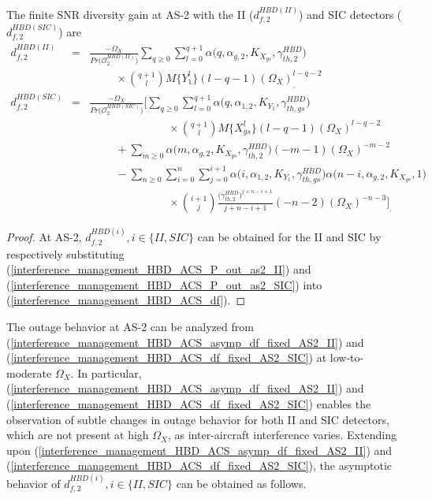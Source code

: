 \begin{proposition}
The finite SNR diversity gain at AS-2 with the II ($d_{f,2}^{HBD(II)}$) and SIC detectors ($d_{f,2}^{HBD(SIC)}$) are
\begin{eqnarray} 
d_{f,2}^{HBD(II)} & = &  \frac{-\Omega_X}{Pr\big(\mathcal{O}_{2}^{HBD(II)}\big)} \sum_{q\geq0} \sum_{l=0}^{q+1} \alpha\big(q,\alpha_{g,2}, K_{X_{gs}}, \gamma_{th,2}^{HBD}\big) \nonumber \\
 & & \hspace{1cm} \times \binom{q+1}{l} M\{Y_1^l\} (l-q-1) (\Omega_X)^{l-q-2}_, \label{interference_management_HBD_ACS_asymp_df_fixed_AS2_II} \\
d_{f,2}^{HBD(SIC)} & = & \frac{-\Omega_X}{Pr\big(\mathcal{O}_{2}^{HBD(SIC)}\big)} \Bigg[  \sum_{q\geq0}\sum_{l=0}^{q+1} \alpha\big(q,\alpha_{1,2},K_{Y_{1}},\gamma_{th,gs}^{HBD}\big) \nonumber \\
 & & \hspace{3cm} \times \binom{q+1}{l} M\{X_{gs}^l\} (l-q-1) (\Omega_{X})^{l-q-2} \nonumber\\
 & & \hspace{1cm} + \sum_{m\geq0} \alpha\big(m,\alpha_{g,2},K_{X_{gs}},\gamma_{th,2}^{HBD}\big) (-m-1) (\Omega_{X})^{-m-2} \nonumber \\
 & & \hspace{1cm} - \sum_{n\geq0}\sum_{i=0}^{n}\sum_{j=0}^{i+1} \alpha\big(i,\alpha_{1,2},K_{Y_{1}},\gamma_{th,gs}^{HBD}\big) \alpha\big(n-i,\alpha_{g,2},K_{X_{gs}},1\big) \nonumber\\
 & & \hspace{3cm} \times \binom{i+1}{j} \frac{\big(\gamma_{th,2}^{HBD}\big)^{j+n-i+1}}{j+n-i+1} (-n-2) (\Omega_X)^{-n-3} \Bigg]_. \label{interference_management_HBD_ACS_df_fixed_AS2_SIC}
\end{eqnarray}
\end{proposition}
\begin{proof}
At AS-2, $d_{f,2}^{HBD(i)}, i \in \{II,SIC\}$ can be obtained for the II and SIC by respectively substituting (\ref{interference_management_HBD_ACS_P_out_as2_II}) and (\ref{interference_management_HBD_ACS_P_out_as2_SIC}) into (\ref{interference_management_HBD_ACS_df}).
\end{proof}

The outage behavior at AS-2 can be analyzed from (\ref{interference_management_HBD_ACS_asymp_df_fixed_AS2_II}) and (\ref{interference_management_HBD_ACS_df_fixed_AS2_SIC}) at low-to-moderate $\Omega_X$. In particular, (\ref{interference_management_HBD_ACS_asymp_df_fixed_AS2_II}) and (\ref{interference_management_HBD_ACS_df_fixed_AS2_SIC}) enables the observation of subtle changes in outage behavior for both II and SIC detectors, which are not present at high $\Omega_X$, as inter-aircraft interference varies. Extending upon (\ref{interference_management_HBD_ACS_asymp_df_fixed_AS2_II}) and (\ref{interference_management_HBD_ACS_df_fixed_AS2_SIC}),  the asymptotic behavior of $d_{f,2}^{HBD(i)}, i \in \{II,SIC\}$ can be obtained as follows.

